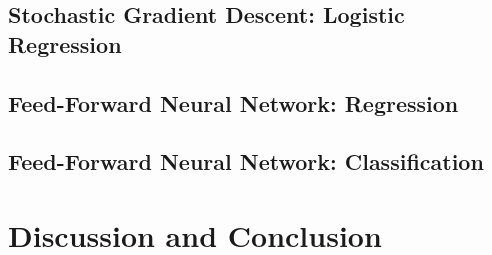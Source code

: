 \documentclass[]{article}
\begin{document}
\subsection{Stochastic Gradient Descent: Logistic Regression}

\subsection{Feed-Forward Neural Network: Regression}



\subsection{Feed-Forward Neural Network: Classification}



\clearpage
\section{Discussion and Conclusion} \label{conclusion}

\clearpage


\end{document}
